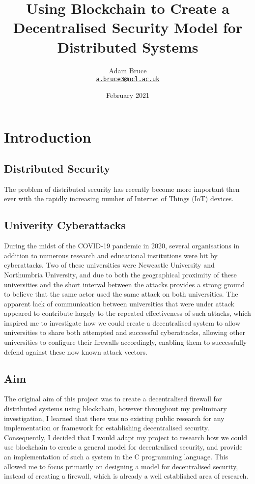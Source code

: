 \documentclass[a4paper]{article}
\title{Using Blockchain to Create a Decentralised Security Model for Distributed Systems}
\date{February 2021}
\author{Adam Bruce \\ \texttt{\href{mailto:a.bruce3@ncl.ac.uk}{a.bruce3@ncl.ac.uk}}}
\begin{document}
\maketitle

\begin{abstract}

\end{abstract}

\newpage
\tableofcontents
\newpage

\section{Introduction}
\subsection{Distributed Security}
The problem of distributed security has recently become more important then ever with the rapidly increasing number of Internet of Things (IoT) devices.

\subsection{Univerity Cyberattacks}
During the midst of the COVID-19 pandemic in 2020, several organisations in addition to numerous research and educational institutions were hit by cyberattacks. Two of these universities were Newcastle University and Northumbria University, and due to both the geographical proximity of these universities and the short interval between the attacks provides a strong ground to believe that the same actor used the same attack on both universities.
The apparent lack of communication between universities that were under attack appeared to contribute largely to the repeated effectiveness of such attacks, which inspired me to investigate how we could create a decentralised system to allow universities to share both attempted and successful cyberattacks, allowing other universities to configure their firewalls accordingly, enabling them to successfully defend against these now known attack vectors.

\subsection{Aim}
The original aim of this project was to create a decentralised firewall for distributed systems using blockchain, however throughout my preliminary investigation, I learned that there was no existing public research for any implementation or framework for establishing decentralised security.
Consequently, I decided that I would adapt my project to research how we could use blockchain to create a general model for decentralised security, and provide an implementation of such a system in the C programming language. This allowed me to focus primarily on designing a model for decentralised security, instead of creating a firewall, which is already a well established area of research.
\end{document}
